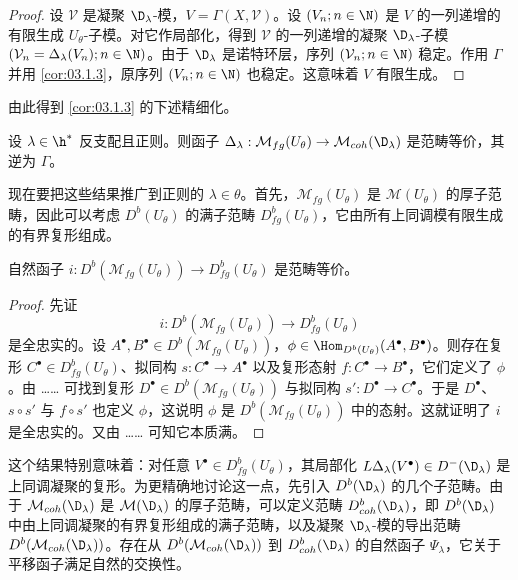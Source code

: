 \begin{proof}
设 $\mathcal{V}$ 是凝聚 $\D_\lambda$-模，$V=\Gamma(X,\mathcal{V})$。设 $(V_n;n\in\N)$ 是 $V$ 的一列递增的有限生成 $U_\theta$-子模。对它作局部化，得到 $\mathcal{V}$ 的一列递增的凝聚 $\D_\lambda$-子模 $(\mathcal{V}_n=\Delta_\lambda(V_n);n\in\N)$。由于 $\D_\lambda$ 是诺特环层，序列 $(\mathcal{V}_n;n\in\N)$ 稳定。作用 $\Gamma$ 并用 \ref{cor:03.1.3}，原序列 $(V_n;n\in\N)$ 也稳定。这意味着 $V$ 有限生成。
\end{proof}

由此得到 \ref{cor:03.1.3} 的下述精细化。

\begin{proposition}\label{prop:03.1.18}
设 $\lambda\in\h^*$ 反支配且正则。则函子 $\Delta_\lambda:\mathcal{M}_{fg}(U_\theta)\to\mathcal{M}_{coh}(\D_\lambda)$ 是范畴等价，其逆为 $\Gamma$。
\end{proposition}

现在要把这些结果推广到正则的 $\lambda\in\theta$。首先，$\mathcal{M}_{fg}(U_\theta)$ 是 $\mathcal{M}(U_\theta)$ 的厚子范畴，因此可以考虑 $D^b(U_\theta)$ 的满子范畴 $D^b_{fg}(U_\theta)$，它由所有上同调模有限生成的有界复形组成。

\begin{lemma}\label{lem:03.1.19}
自然函子 $i:D^b(\mathcal{M}_{fg}(U_\theta))\to D^b_{fg}(U_\theta)$ 是范畴等价。
\end{lemma}

\begin{proof}
先证
$$i:D^b(\mathcal{M}_{fg}(U_\theta))\longrightarrow D^b_{fg}(U_\theta)$$
是全忠实的。设 $A^\bullet,B^\bullet\in D^b(\mathcal{M}_{fg}(U_\theta))$，$\phi\in\Hom_{D^b(U_\theta)}(A^\bullet,B^\bullet)$。则存在复形 $C^\bullet\in D^b_{fg}(U_\theta)$、拟同构 $s:C^\bullet\to A^\bullet$ 以及复形态射 $f:C^\bullet\to B^\bullet$，它们定义了 $\phi$。由 …… 可找到复形 $D^\bullet\in D^b(\mathcal{M}_{fg}(U_\theta))$ 与拟同构 $s':D^\bullet\to C^\bullet$。于是 $D^\bullet$、$s\circ s'$ 与 $f\circ s'$ 也定义 $\phi$，这说明 $\phi$ 是 $D^b(\mathcal{M}_{fg}(U_\theta))$ 中的态射。这就证明了 $i$ 是全忠实的。又由 …… 可知它本质满。
\end{proof}

这个结果特别意味着：对任意 $V^\bullet\in D^b_{fg}(U_\theta)$，其局部化 $L\Delta_\lambda(V^\bullet)\in D^-(\D_\lambda)$ 是上同调凝聚的复形。为更精确地讨论这一点，先引入 $D^b(\D_\lambda)$ 的几个子范畴。由于 $\mathcal{M}_{coh}(\D_\lambda)$ 是 $\mathcal{M}(\D_\lambda)$ 的厚子范畴，可以定义范畴 $D^b_{coh}(\D_\lambda)$，即 $D^b(\D_\lambda)$ 中由上同调凝聚的有界复形组成的满子范畴，以及凝聚 $\D_\lambda$-模的导出范畴 $D^b(\mathcal{M}_{coh}(\D_\lambda))$。存在从 $D^b(\mathcal{M}_{coh}(\D_\lambda))$ 到 $D^b_{coh}(\D_\lambda)$ 的自然函子 $\Psi_\lambda$，它关于平移函子满足自然的交换性。

